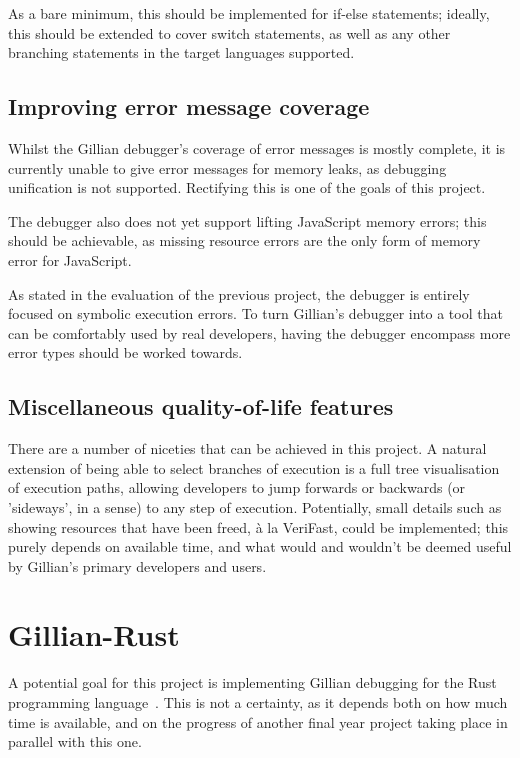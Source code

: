 As a bare minimum, this should be implemented for if-else statements; ideally,
this should be extended to cover switch statements, as well as any other
branching statements in the target languages supported.



\subsection{Improving error message coverage}

Whilst the Gillian debugger's coverage of error messages is mostly complete, it
is currently unable to give error messages for memory leaks, as debugging
unification is not supported. Rectifying this is one of the goals of this
project.

The debugger also does not yet support lifting JavaScript memory errors; this
should be achievable, as missing resource errors are the only form of memory
error for JavaScript.

As stated in the evaluation of the previous project, the debugger is entirely
focused on symbolic execution errors. To turn Gillian's debugger into a tool
that can be comfortably used by real developers, having the debugger encompass
more error types should be worked towards.


\subsection{Miscellaneous quality-of-life features}

There are a number of niceties that can be achieved in this project. A natural
extension of being able to select branches of execution is a full tree
visualisation of execution paths, allowing developers to jump forwards or
backwards (or 'sideways', in a sense) to any step of execution. Potentially,
small details such as showing resources that have been freed, à la VeriFast,
could be implemented; this purely depends on available time, and what would and
wouldn't be deemed useful by Gillian's primary developers and users.


\section{Gillian-Rust}

A potential goal for this project is implementing Gillian debugging for the
Rust programming language~\cite{rust}. This is not a certainty, as it depends
both on how much time is available, and on the progress of another final year
project taking place in parallel with this one.

